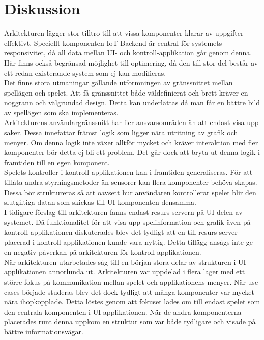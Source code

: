 \section{Diskussion}
Arkitekturen lägger stor tilltro till att vissa komponenter klarar av uppgifter effektivt. Speciellt komponenten IoT-Backend är central för systemets responsivitet, då all data mellan UI- och kontroll-applikation går genom denna. Här finns också begränsad möjlighet till optimering, då den till stor del består av ett redan existerande system som ej kan modifieras.\\

Det finns stora utmaningar gällande utformningen av gränssnittet mellan spellägen och spelet. Att få gränssnittet både väldefinierat och brett kräver en noggrann och välgrundad design. Detta kan underlättas då man får en bättre bild av spellägen som ska implementeras.\\

Arkitekturens användargränssnitt har fler ansvarsområden än att endast visa upp saker. Dessa innefattar främst logik som ligger nära utritning av grafik och menyer. Om denna logik inte växer alltför mycket och kräver interaktion med fler komponenter bör detta ej bli ett problem. Det går dock att bryta ut denna logik i framtiden till en egen komponent.\\

Spelets kontroller i kontroll-applikationen kan i framtiden generaliseras. För att tillåta andra styrningsmetoder än sensorer kan flera komponenter behöva skapas. Dessa bör struktureras så att oavsett hur användaren kontrollerar spelet blir den slutgiltiga datan som skickas till UI-komponenten densamma.\\

I tidigare förslag till arkitekturen fanns endast resurs-servern på UI-delen av systemet. Då funktionalitet för att visa upp spelinformation och grafik även på kontroll-applikationen diskuterades blev det tydligt att en till resurs-server placerad i kontroll-applikationen kunde vara nyttig. Detta tillägg ansågs inte ge en negativ påverkan på arkitekturen för kontroll-applikationen.\\

När arkitekturen utarbetades såg till en början stora delar av strukturen i UI-applikationen annorlunda ut. Arkitekturen var uppdelad i flera lager med ett större fokus på kommunikation mellan spelet och applikationens menyer. När use-cases började studeras blev det dock tydligt att många komponenter var mycket nära ihopkopplade. Detta löstes genom att fokuset lades om till endast spelet som den centrala komponenten i UI-applikationen. När de andra komponenterna placerades runt denna uppkom en struktur som var både tydligare och visade på bättre informationsvägar.\\
